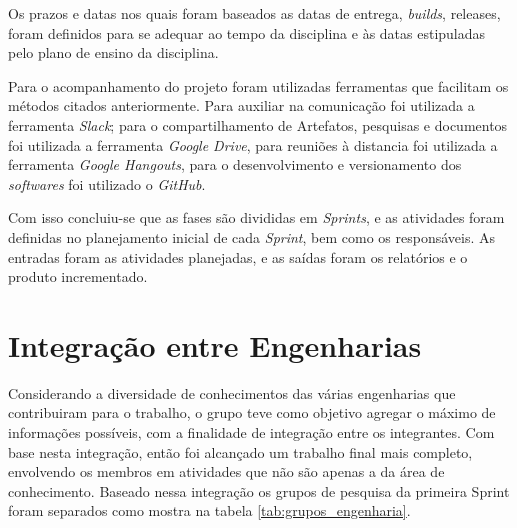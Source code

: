 Os prazos e datas nos quais foram baseados as datas de entrega, \textit{builds}, releases, foram definidos para se adequar ao tempo da disciplina e às datas estipuladas pelo plano de ensino da disciplina.

Para o acompanhamento do projeto foram utilizadas ferramentas que facilitam os métodos citados anteriormente. Para auxiliar na comunicação foi utilizada a ferramenta \textit{Slack}; para o compartilhamento de Artefatos, pesquisas e documentos foi utilizada a ferramenta \textit{Google Drive}, para reuniões à distancia foi utilizada a ferramenta \textit{Google Hangouts}, para o desenvolvimento e versionamento dos \textit{softwares} foi utilizado o \textit{GitHub}.

Com isso concluiu-se que as fases são divididas em \textit{Sprints}, e as atividades foram definidas no planejamento inicial de cada \textit{Sprint}, bem como os responsáveis. As entradas foram as atividades planejadas, e as saídas foram os relatórios e o produto incrementado.

\section{Integração entre Engenharias}

Considerando a diversidade de conhecimentos das várias engenharias que contribuiram para o trabalho, o grupo teve como objetivo agregar o máximo de informações possíveis, com a finalidade de integração entre os integrantes. Com base nesta integração, então foi alcançado um trabalho final mais completo, envolvendo os membros em atividades que não são apenas a da área de conhecimento. Baseado nessa integração os grupos de pesquisa da primeira Sprint foram separados como mostra na tabela \ref{tab:grupos_engenharia}.

\begin{table}[!h]
\centering
{}
\caption{My caption}
\label{tab:grupos_engenharia}
\end{table}

